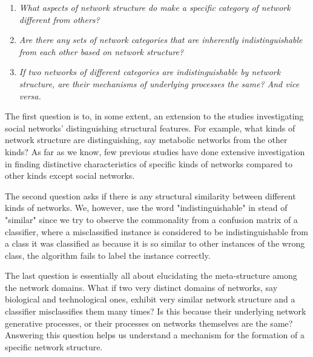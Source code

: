 \documentclass{article}
\begin{document}
\begin{enumerate}
	\item \textit{What aspects of network structure do make a specific category of network different from others?}
	\item \textit{Are there any sets of network categories that are inherently indistinguishable from each other based on network structure?} 
	\item \textit{If two networks of different categories are indistinguishable by network structure, are their mechanisms of underlying processes the same? And vice versa.}
\end{enumerate}

The first question is to, in some extent, an extension to the studies investigating social networks' distinguishing structural features. For example, what kinds of network structure are distinguishing, say metabolic networks from the other kinds? As far as we know, few previous studies have done extensive investigation in finding distinctive characteristics of specific kinds of networks compared to other kinds except social networks.

The second question asks if there is any structural similarity between different kinds of networks. We, however, use the word "indistinguishable" in stead of "similar" since we try to observe the commonality from a confusion matrix of a classifier, where a misclassified instance is considered to be indistinguishable from a class it was classified as because it is so similar to other instances of the wrong class, the algorithm fails to label the instance correctly.


The last question is essentially all about elucidating the meta-structure among the network domains. What if two very distinct domains of networks, say biological and technological ones, exhibit very similar network structure and a classifier misclassifies them many times? Is this because their underlying network generative processes, or their processes on networks themselves are the same? Answering this question helps us understand a mechanism for the formation of a specific network structure.
\end{document}
